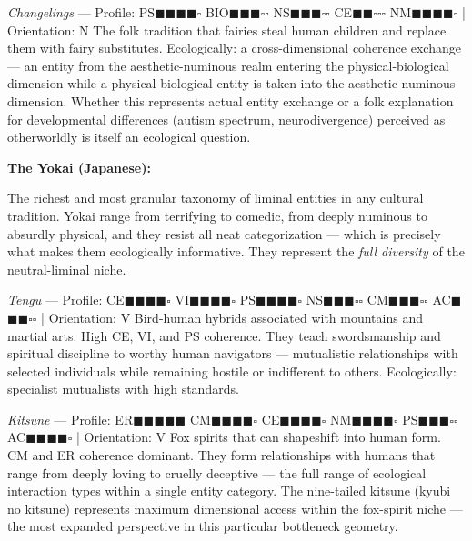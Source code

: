 \textit{Changelings} — Profile: PS$\blacksquare$$\blacksquare$$\blacksquare$$\blacksquare$$\square$ BIO$\blacksquare$$\blacksquare$$\blacksquare$$\square$$\square$ NS$\blacksquare$$\blacksquare$$\blacksquare$$\square$$\square$ CE$\blacksquare$$\blacksquare$$\square$$\square$$\square$ NM$\blacksquare$$\blacksquare$$\blacksquare$$\blacksquare$$\square$ | Orientation: N The folk tradition that fairies steal human children and replace them with fairy substitutes. Ecologically: a cross-dimensional coherence exchange — an entity from the aesthetic-numinous realm entering the physical-biological dimension while a physical-biological entity is taken into the aesthetic-numinous dimension. Whether this represents actual entity exchange or a folk explanation for developmental differences (autism spectrum, neurodivergence) perceived as otherworldly is itself an ecological question.


\textbf{The Yokai (Japanese):}


The richest and most granular taxonomy of liminal entities in any cultural tradition. Yokai range from terrifying to comedic, from deeply numinous to absurdly physical, and they resist all neat categorization — which is precisely what makes them ecologically informative. They represent the \textit{full diversity} of the neutral-liminal niche.


\textit{Tengu} — Profile: CE$\blacksquare$$\blacksquare$$\blacksquare$$\blacksquare$$\square$ VI$\blacksquare$$\blacksquare$$\blacksquare$$\blacksquare$$\square$ PS$\blacksquare$$\blacksquare$$\blacksquare$$\blacksquare$$\square$ NS$\blacksquare$$\blacksquare$$\blacksquare$$\square$$\square$ CM$\blacksquare$$\blacksquare$$\blacksquare$$\square$$\square$ AC$\blacksquare$$\blacksquare$$\blacksquare$$\square$$\square$ | Orientation: V Bird-human hybrids associated with mountains and martial arts. High CE, VI, and PS coherence. They teach swordsmanship and spiritual discipline to worthy human navigators — mutualistic relationships with selected individuals while remaining hostile or indifferent to others. Ecologically: specialist mutualists with high standards.


\textit{Kitsune} — Profile: ER$\blacksquare$$\blacksquare$$\blacksquare$$\blacksquare$$\blacksquare$ CM$\blacksquare$$\blacksquare$$\blacksquare$$\blacksquare$$\square$ CE$\blacksquare$$\blacksquare$$\blacksquare$$\blacksquare$$\square$ NM$\blacksquare$$\blacksquare$$\blacksquare$$\blacksquare$$\square$ PS$\blacksquare$$\blacksquare$$\blacksquare$$\square$$\square$ AC$\blacksquare$$\blacksquare$$\blacksquare$$\blacksquare$$\square$ | Orientation: V Fox spirits that can shapeshift into human form. CM and ER coherence dominant. They form relationships with humans that range from deeply loving to cruelly deceptive — the full range of ecological interaction types within a single entity category. The nine-tailed kitsune (kyubi no kitsune) represents maximum dimensional access within the fox-spirit niche — the most expanded perspective in this particular bottleneck geometry.


